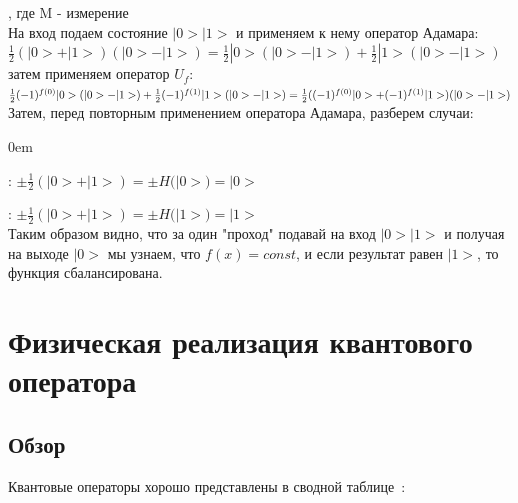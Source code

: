 \documentclass[11pt]{report}
\begin{document}
, где M - измерение \\

На вход подаем состояние $|0>|1>$ и применяем к нему оператор Адамара:\\

$\frac{1}{2}(|0>+|1>)(|0>-|1>) = \frac{1}{2}|0>(|0>-|1>)+\frac{1}{2}|1>(|0>-|1>)$ \\

затем применяем оператор $U_f$: \\

$\frac{1}{2}(-1)^{f(0)}|0>(|0>-|1>) + \frac{1}{2}(-1)^{f(1)}|1>(|0>-|1>) = \\
\frac{1}{2}((-1)^{f(0)}|0> + (-1)^{f(1)}|1>)(|0>-|1>)
$ \\

Затем, перед повторным применением оператора Адамара, разберем случаи: \\

\begin{description}
\addtolength{\itemindent}{0.80cm}
\itemsep0em 
\item[$f(x)=const$]: $\pm \frac{1}{2}(|0> + |1>) = \pm H(|0>) = |0> $
\item[$f(0) \neq f(1) $]: $\pm \frac{1}{2}(|0> + |1>) = \pm H(|1>) = |1>$ \\

Таким образом видно, что за один "проход" подавай на вход $|0>|1>$ и получая на выходе $|0>$ мы узнаем, что $f(x)=const$, и если результат равен $|1>$, то функция сбалансирована.

\end{description}

\chapter{Физическая реализация квантового оператора}
\section{Обзор}
Квантовые операторы хорошо представлены в сводной таблице~\cite{qbit}: \\
\end{document}
